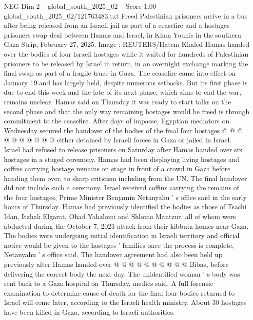 \begin{textsample}{NEG Dim 2 – global\_south\_2025\_02 – Score 1.00 – global\_south\_2025\_02/121763483.txt}  \label{ex:f2_neg_066}
Freed Palestinian prisoners arrive in a bus after being released from an Israeli jail as part of a ceasefire and a hostages-prisoners swap deal between Hamas and Israel, in Khan Younis in the southern Gaza Strip, February 27, 2025.
Image : REUTERS/Hatem Khaled Hamas handed over the bodies of four Israeli hostages while it waited for hundreds of Palestinian prisoners to be released by Israel in return, in an overnight exchange marking the final swap as part of a fragile truce in Gaza.
The ceasefire came into effect on January 19 and has largely held, despite numerous setbacks.
But its first phase is due to end this week and the fate of its next phase, which aims to end the war, remains unclear.
Hamas said on Thursday it was ready to start talks on the second phase and that the only way remaining hostages would be freed is through commitment to the ceasefire.
After days of impasse, Egyptian mediators on Wednesday secured the handover of the bodies of the final four hostages @ @ @ @ @ @ @ @ @ @ either detained by Israeli forces in Gaza or jailed in Israel.
Israel had refused to release prisoners on Saturday after Hamas handed over six hostages in a staged ceremony.
Hamas had been displaying living hostages and coffins carrying hostage remains on stage in front of a crowd in Gaza before handing them over, to sharp criticism including from the UN.
The final handover did not include such a ceremony.
Israel received coffins carrying the remains of the four hostages, Prime Minister Benjamin Netanyahu ' s office said in the early hours of Thursday.
Hamas had previously identified the bodies as those of Tsachi Idan, Itzhak Elgarat, Ohad Yahalomi and Shlomo Mantzur, all of whom were abducted during the October 7, 2023 attack from their kibbutz homes near Gaza.
The bodies were undergoing initial identification in Israeli territory and official notice would be given to the hostages ' families once the process is complete, Netanyahu ' s office said.
The handover agreement had also been held up previously after Hamas handed over @ @ @ @ @ @ @ @ @ @ Bibas, before delivering the correct body the next day.
The unidentified woman ' s body was sent back to a Gaza hospital on Thursday, medics said.
A full forensic examination to determine cause of death for the final four bodies returned to Israel will come later, according to the Israeli health ministry.
About 30 hostages have been killed in Gaza, according to Israeli authorities.

\end{textsample}
